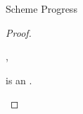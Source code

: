 \begin{theorem}{Scheme Progress}
\begin{proof}
\begin{case}{\pssm}
\begin{subcase}{\x}

\psvalcanin
{\first{\varexpm}}
{\y, \z}
\psred
{\expsm{\x}{(\y)}}
{\expnild}
\psred
{\expsm{\x}{(\z)}}
{\expcons{(\expsm{\second{\varcsm}}{\first{\varvalum}})}{(\expsm{\x}{\second{\varvalum}})}}

\end{subcase}


\renewcommand{\x}{\csfun{\second{\varcsm}}{\third{\varcsm}}}
\renewcommand{\y}{\expfabss{\first{\varvarm}}{\first{\vartym}}{\first{\varexpm}}}

\begin{subcase}{\x}

\psvalcaneq
{\first{\varexpm}}
{\y}
\psred
{\expsm{(\x)}{(\y)}}
{\expfabsd{\first{\varvars}}{\expsm{\third{\varcsm}}{(\expfapp{(\y)}{(\expms{\second{\varcsm}}{\first{\varvars}})})}}}

\end{subcase}


\renewcommand{\x}{\csfor{\first{\csvarm}}{\second{\varcsm}}}
\renewcommand{\y}{\exptabs{\second{\tyvarm}}{\second{\varexpm}}}

\begin{subcase}{\x}

\psvalcaneq
{\first{\varexpm}}
{\y}
\psred
{\expsm{(\x)}{(\y)}}
{\expsm{\cssubst{\second{\varcsm}}{\cslump}{\first{\csvarm}}}{\expsubst{\second{\varexpm}}{\tylump}{\second{\tyvarm}}}}

\end{subcase}


\renewcommand{\x}{\csbrand{\first{\varbrand}}{\first{\vartym}}}

\begin{subcase}{\x}

\expsm{(\x)}{\first{\varexpm}} is an \prouv.

\end{subcase}

\end{case}

\end{proof}

\end{theorem}
